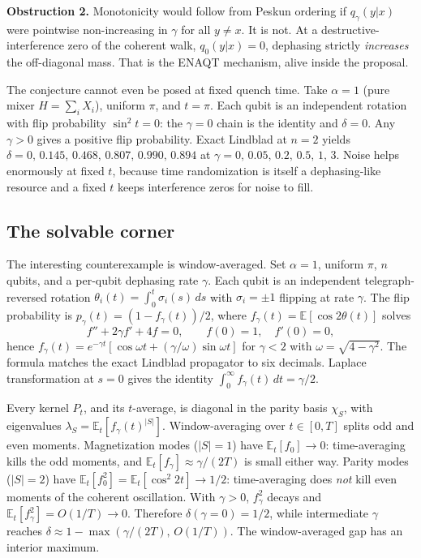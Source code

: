 \documentclass[aps,prx,reprint,floatfix,amsmath,amssymb,amsfonts]{revtex4-2}
\begin{document}
\noindent\textbf{Obstruction 2.}
Monotonicity would follow from Peskun ordering if $q_\gamma(y|x)$ were
pointwise non-increasing in $\gamma$ for all $y\neq x$. It is not. At a
destructive-interference zero of the coherent walk, $q_0(y|x)=0$,
dephasing strictly \emph{increases} the off-diagonal mass. That is the
ENAQT mechanism, alive inside the proposal.

The conjecture cannot even be posed at fixed quench time. Take
$\alpha=1$ (pure mixer $H=\sum_i X_i$), uniform $\pi$, and $t=\pi$. Each
qubit is an independent rotation with flip probability $\sin^2 t = 0$:
the $\gamma=0$ chain is the identity and $\delta=0$. Any $\gamma>0$
gives a positive flip probability. Exact Lindblad at $n=2$ yields
$\delta = 0,\, 0.145,\, 0.468,\, 0.807,\, 0.990,\, 0.894$ at
$\gamma = 0,\, 0.05,\, 0.2,\, 0.5,\, 1,\, 3$. Noise helps enormously at
fixed $t$, because time randomization is itself a dephasing-like
resource and a fixed $t$ keeps interference zeros for noise to fill.

\subsection{The solvable corner}

The interesting counterexample is window-averaged. Set $\alpha=1$,
uniform $\pi$, $n$ qubits, and a per-qubit dephasing rate $\gamma$. Each
qubit is an independent telegraph-reversed rotation
$\theta_i(t)=\int_0^t \sigma_i(s)\,ds$ with $\sigma_i=\pm 1$ flipping at
rate $\gamma$. The flip probability is $p_\gamma(t)=(1-f_\gamma(t))/2$,
where $f_\gamma(t)=\mathbb{E}[\cos 2\theta(t)]$ solves
\begin{equation}
  f'' + 2\gamma f' + 4f = 0,
  \qquad
  f(0)=1,\quad f'(0)=0,
\end{equation}
hence $f_\gamma(t) = e^{-\gamma t}[\cos\omega t + (\gamma/\omega)\sin\omega t]$
for $\gamma<2$ with $\omega=\sqrt{4-\gamma^2}$. The formula matches the
exact Lindblad propagator to six decimals. Laplace transformation at
$s=0$ gives the identity $\int_0^\infty f_\gamma(t)\,dt = \gamma/2$.

Every kernel $P_t$, and its $t$-average, is diagonal in the parity
basis $\chi_S$, with eigenvalues $\lambda_S = \mathbb{E}_t[f_\gamma(t)^{|S|}]$.
Window-averaging over $t\in[0,T]$ splits odd and even moments.
Magnetization modes ($|S|=1$) have $\mathbb{E}_t[f_0]\to 0$:
time-averaging kills the odd moments, and
$\mathbb{E}_t[f_\gamma]\approx \gamma/(2T)$ is small either way. Parity
modes ($|S|=2$) have $\mathbb{E}_t[f_0^2] = \mathbb{E}_t[\cos^2 2t] \to 1/2$:
time-averaging does \emph{not} kill even moments of the coherent
oscillation. With $\gamma>0$, $f_\gamma^2$ decays and
$\mathbb{E}_t[f_\gamma^2]=O(1/T)\to 0$. Therefore
$\delta(\gamma=0)=1/2$, while intermediate $\gamma$ reaches
$\delta \approx 1 - \max(\gamma/(2T),\, O(1/T))$. The window-averaged
gap has an interior maximum.
\end{document}
